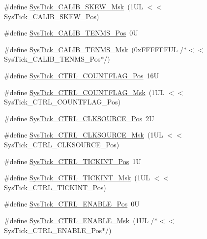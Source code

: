 \begin{DoxyCompactItemize}
\item 
\#define \hyperlink{group___c_m_s_i_s___sys_tick_ga8a6a85a87334776f33d77fd147587431}{Sys\+Tick\+\_\+\+C\+A\+L\+I\+B\+\_\+\+S\+K\+E\+W\+\_\+\+Msk}~(1\+U\+L $<$$<$ Sys\+Tick\+\_\+\+C\+A\+L\+I\+B\+\_\+\+S\+K\+E\+W\+\_\+\+Pos)
\item 
\#define \hyperlink{group___c_m_s_i_s___sys_tick_gacae558f6e75a0bed5d826f606d8e695e}{Sys\+Tick\+\_\+\+C\+A\+L\+I\+B\+\_\+\+T\+E\+N\+M\+S\+\_\+\+Pos}~0U
\item 
\#define \hyperlink{group___c_m_s_i_s___sys_tick_gaf1e68865c5aece2ad58971225bd3e95e}{Sys\+Tick\+\_\+\+C\+A\+L\+I\+B\+\_\+\+T\+E\+N\+M\+S\+\_\+\+Msk}~(0x\+F\+F\+F\+F\+F\+F\+U\+L /$\ast$$<$$<$ Sys\+Tick\+\_\+\+C\+A\+L\+I\+B\+\_\+\+T\+E\+N\+M\+S\+\_\+\+Pos$\ast$/)
\item 
\#define \hyperlink{group___c_m_s_i_s___sys_tick_gadbb65d4a815759649db41df216ed4d60}{Sys\+Tick\+\_\+\+C\+T\+R\+L\+\_\+\+C\+O\+U\+N\+T\+F\+L\+A\+G\+\_\+\+Pos}~16U
\item 
\#define \hyperlink{group___c_m_s_i_s___sys_tick_ga1bf3033ecccf200f59baefe15dbb367c}{Sys\+Tick\+\_\+\+C\+T\+R\+L\+\_\+\+C\+O\+U\+N\+T\+F\+L\+A\+G\+\_\+\+Msk}~(1\+U\+L $<$$<$ Sys\+Tick\+\_\+\+C\+T\+R\+L\+\_\+\+C\+O\+U\+N\+T\+F\+L\+A\+G\+\_\+\+Pos)
\item 
\#define \hyperlink{group___c_m_s_i_s___sys_tick_ga24fbc69a5f0b78d67fda2300257baff1}{Sys\+Tick\+\_\+\+C\+T\+R\+L\+\_\+\+C\+L\+K\+S\+O\+U\+R\+C\+E\+\_\+\+Pos}~2U
\item 
\#define \hyperlink{group___c_m_s_i_s___sys_tick_gaa41d06039797423a46596bd313d57373}{Sys\+Tick\+\_\+\+C\+T\+R\+L\+\_\+\+C\+L\+K\+S\+O\+U\+R\+C\+E\+\_\+\+Msk}~(1\+U\+L $<$$<$ Sys\+Tick\+\_\+\+C\+T\+R\+L\+\_\+\+C\+L\+K\+S\+O\+U\+R\+C\+E\+\_\+\+Pos)
\item 
\#define \hyperlink{group___c_m_s_i_s___sys_tick_ga88f45bbb89ce8df3cd2b2613c7b48214}{Sys\+Tick\+\_\+\+C\+T\+R\+L\+\_\+\+T\+I\+C\+K\+I\+N\+T\+\_\+\+Pos}~1U
\item 
\#define \hyperlink{group___c_m_s_i_s___sys_tick_ga95bb984266ca764024836a870238a027}{Sys\+Tick\+\_\+\+C\+T\+R\+L\+\_\+\+T\+I\+C\+K\+I\+N\+T\+\_\+\+Msk}~(1\+U\+L $<$$<$ Sys\+Tick\+\_\+\+C\+T\+R\+L\+\_\+\+T\+I\+C\+K\+I\+N\+T\+\_\+\+Pos)
\item 
\#define \hyperlink{group___c_m_s_i_s___sys_tick_ga0b48cc1e36d92a92e4bf632890314810}{Sys\+Tick\+\_\+\+C\+T\+R\+L\+\_\+\+E\+N\+A\+B\+L\+E\+\_\+\+Pos}~0U
\item 
\#define \hyperlink{group___c_m_s_i_s___sys_tick_ga16c9fee0ed0235524bdeb38af328fd1f}{Sys\+Tick\+\_\+\+C\+T\+R\+L\+\_\+\+E\+N\+A\+B\+L\+E\+\_\+\+Msk}~(1\+U\+L /$\ast$$<$$<$ Sys\+Tick\+\_\+\+C\+T\+R\+L\+\_\+\+E\+N\+A\+B\+L\+E\+\_\+\+Pos$\ast$/)

\end{DoxyCompactItemize}
